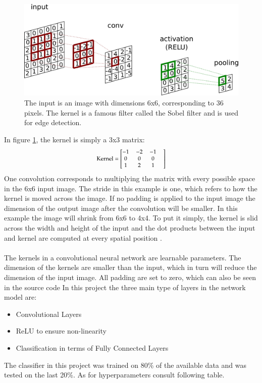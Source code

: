 \documentclass[11pt, fleqn, titlepage]{article}
\newcommand{\1}[1]{\mathds{1}\left[#1\right]}
\begin{document}
	\begin{figure}[H]
		\centering
		\includegraphics[width=0.55\linewidth, trim={0 0 69cm 0},clip]{imgs/convolution}
		\caption{The input is an image with dimensions 6x6, corresponding to 36 pixels. The kernel is a famous filter called the Sobel filter and is used for edge detection.}
		\label{fig:convolution}
	\end{figure}
	\noindent
	In figure \ref{fig:convolution}, the kernel is simply a 3x3 matrix: 
	\[\medmath{\text{Kernel} = \begin{bmatrix}
			-1 & -2 & -1 & \\ 0 & 0 & 0 &  \\
			1 & 2 & 1
	\end{bmatrix}}  \] 
	One convolution corresponds to multiplying the matrix with every possible space in the 6x6 input image. The stride in this example is one, which refers to how the kernel is moved across the image. If no padding is applied to the input image the dimension of the output image after the convolution will be smaller. In this example the image will shrink from 6x6 to 4x4. To put it simply, the kernel is slid across the width and height of the input and the dot products between the input and kernel are computed at every spatial position \cite{cnn_paper}.
	\\\\
	The kernels in a convolutional neural network are learnable parameters. The dimension of the kernels are smaller than the input, which in turn will reduce the dimension of the input image. All padding are set to zero, which can also be seen in the source code %
	In this project the three main type of layers in the network model are:

	\begin{itemize}
	\item Convolutional Layers 
	\item ReLU to ensure non-linearity 
	\item Classification in terms of Fully Connected Layers
	\end{itemize}
	\noindent
	The classifier in this project was trained on 80\% of the available data and was tested on the last 20\%. As for hyperparameters consult following table.
	
\end{document}
